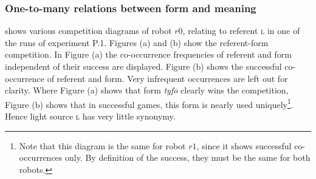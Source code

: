 \subsubsection{One-to-many relations between form and meaning}

 shows various competition diagrams of robot $r0$, relating to referent \textsc{l} in one of the runs of experiment P.1. Figures (a) and (b) show the referent-form competition. In Figure (a) the co-occurrence frequencies of referent and form independent of their success are displayed. Figure (b) shows the successful co-occurrence of referent and form. Very infrequent occurrences are left out for clarity. Where Figure (a) shows that form {\it tyfo} clearly wins the competition, Figure (b) shows that  in successful games, this form is nearly used uniquely\footnote{Note that this diagram is the same for robot $r1$, since it shows successful co-occurrences only. By definition of the success, they must be the same for both robots.}. Hence light source \textsc{l} has very little synonymy. 


